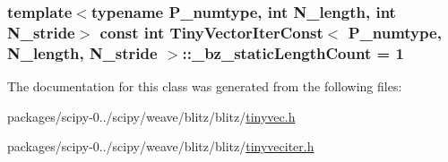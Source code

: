 \subsubsection[{\+\_\+bz\+\_\+static\+Length\+Count}]{\setlength{\rightskip}{0pt plus 5cm}template$<$typename P\+\_\+numtype, int N\+\_\+length, int N\+\_\+stride$>$ const int {\bf Tiny\+Vector\+Iter\+Const}$<$ P\+\_\+numtype, N\+\_\+length, N\+\_\+stride $>$\+::\+\_\+bz\+\_\+static\+Length\+Count = 1\hspace{0.3cm}{\ttfamily [static]}}\label{classTinyVectorIterConst_a2a56fae035a5f29da7aa981c45c95f7c}


The documentation for this class was generated from the following files\+:\begin{DoxyCompactItemize}
\item 
packages/scipy-\/0../scipy/weave/blitz/blitz/\hyperlink{tinyvec_8h}{tinyvec.\+h}\item 
packages/scipy-\/0../scipy/weave/blitz/blitz/\hyperlink{tinyveciter_8h}{tinyveciter.\+h}\end{DoxyCompactItemize}
